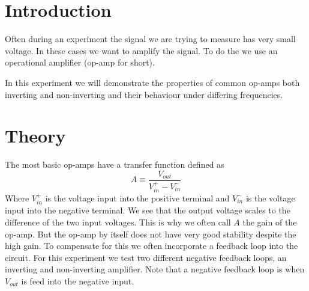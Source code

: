 \documentclass[11pt]{article}
\numberwithin{equation}{section}
\numberwithin{figure}{section}
\numberwithin{table}{section}
\begin{document}


\section{Introduction}
Often during an experiment the signal we are trying to measure has very small voltage. In these cases we want to amplify the signal. To do the we use an operational amplifier (op-amp for short). 

In this experiment we will demonstrate the properties of common op-amps both inverting and non-inverting and their behaviour under differing frequencies.

\section{Theory}
The most basic op-amps have a transfer function defined as
\begin{equation}
A\equiv\frac{V_{out}}{V^+_{in}-V^-_{in}}
\label{EquA}
\end{equation}
Where $V^+_{in}$ is the voltage input into the positive terminal and $V^-_{in}$ is the voltage input into the negative terminal. We see that the output voltage scales to the difference of the two input voltages. This is why we often call $A$ the gain of the op-amp. But the op-amp by itself does not have very good stability despite the high gain. To compensate for this we often incorporate a feedback loop into the circuit. For this experiment we test two different negative feedback loops, an inverting and non-inverting amplifier. Note that a negative feedback loop is when $V_{out}$ is feed into the negative input. 
\end{document}
